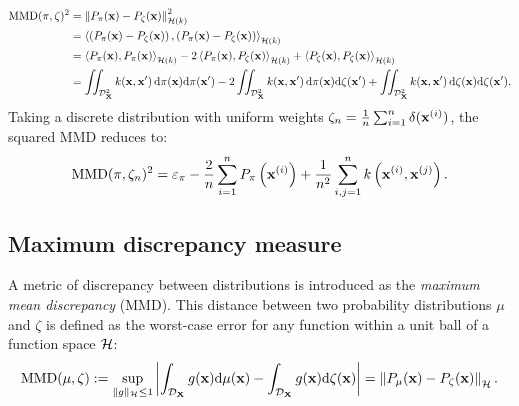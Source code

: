 \begin{subequations}
\begin{align}
    \mathrm{MMD}(\pi, \zeta)^2 &= \left\lVert P_{\pi}({\bf x}) - P_{\zeta}({\bf x}) \right\lVert^2_{\mathcal{H}(k)}\\
        &= \left\langle \left(P_{\pi}({\bf x}) - P_{\zeta}({\bf x}) \right), \left(P_{\pi}({\bf x}) - P_{\zeta}({\bf x}) \right) \right\rangle_{\mathcal{H}(k)}\\
        &= \left\langle P_{\pi}({\bf x}), P_{\pi}({\bf x}) \right\rangle_{\mathcal{H}(k)} - 2 \left\langle P_{\pi}({\bf x}), P_{\zeta}({\bf x}) \right\rangle_{\mathcal{H}(k)} + \left\langle P_{\zeta}({\bf x}), P_{\zeta}({\bf x}) \right\rangle_{\mathcal{H}(k)}\\
        &= \iint_{\mathcal{D}_{{\bf X}}^2} k({\bf x}, {\bf x}')\, \mathrm{d}\pi({\bf x}) \mathrm{d}\pi({\bf x}') - 2 \iint_{\mathcal{D}_{{\bf X}}^2} k({\bf x}, {\bf x}')\, \mathrm{d}\pi({\bf x}) \mathrm{d}\zeta({\bf x}') + \iint_{\mathcal{D}_{{\bf X}}^2} k({\bf x}, {\bf x}')\, \mathrm{d}\zeta({\bf x}) \mathrm{d}\zeta({\bf x}').
\end{align}
\end{subequations}
Taking a discrete distribution with uniform weights $\zeta_n= \frac{1}{n} \sum_{i=1}^{n} \delta({\bf x}^{(i)})$, the squared MMD reduces to: 
\begin{equation}\label{eq:mmd_design}
    \mathrm{MMD}(\pi, \zeta_n)^2 = \varepsilon_\pi - \frac{2}{n} \sum_{i=1}^n P_{\pi}\left({\bf x}^{(i)}\right) + \frac{1}{n^2} \sum_{i, j=1}^n k\left({\bf x}^{(i)}, {\bf x}^{(j)}\right).
\end{equation}



\subsection*{Maximum discrepancy measure}

A metric of discrepancy between distributions is introduced as the \emph{maximum mean discrepancy} (MMD). 
This distance between two probability distributions $\mu$ and $\zeta$ is defined as the worst-case error for any function within a unit ball of a function space $\mathcal{H}$:
\begin{equation}
    \MMD(\mu, \zeta) := %
    \sup_{\lVert g \lVert_{\iH} \leq 1}
            \left | \int_{\iD_{\bX}} g(\bx) \dd \mu(\bx) - \int_{\iD_{\bX}} g(\bx) \dd \zeta(\bx) \right| = \left\lVert P_{\mu}(\bx) - P_{\zeta}(\bx) \right\lVert_{\iH}.
    \label{eq:mmd}  
\end{equation}


